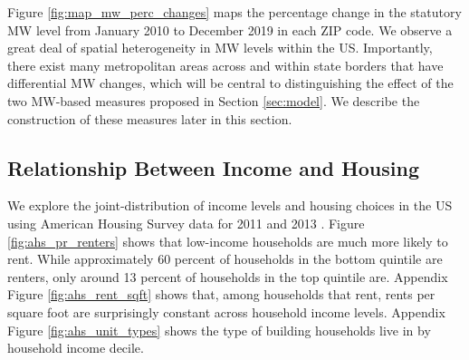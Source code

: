 Figure \ref{fig:map_mw_perc_changes} maps the percentage change in 
the statutory MW level from January 2010 to December 2019 in each ZIP code.
We observe a great deal of spatial heterogeneity in MW levels within the US.
Importantly, there exist many metropolitan areas across and within state 
borders that have differential MW changes, which will be central to 
distinguishing the effect of the two MW-based measures proposed in 
Section \ref{sec:model}.
We describe the construction of these measures later in this section.

\subsection{Relationship Between Income and Housing}
\label{sec:data_income_housing}

We explore the joint-distribution of income levels and housing choices in the US 
using American Housing Survey data for 2011 and 2013 \parencite{ahs2020}.
Figure \ref{fig:ahs_pr_renters} shows that low-income households are much
more likely to rent.
While approximately 60 percent of households in the bottom quintile are renters,
only around 13 percent of households in the top quintile are.
Appendix Figure \ref{fig:ahs_rent_sqft} shows that, among households that rent, 
rents per square foot are surprisingly constant across household income levels.
Appendix Figure \ref{fig:ahs_unit_types} shows the type of building households
live in by household income decile.

